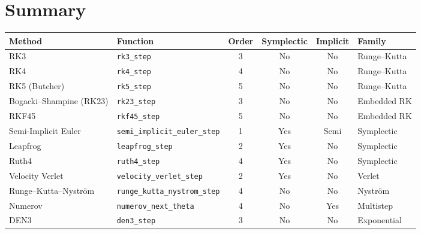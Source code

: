 \documentclass[11pt,a4paper]{article}
\begin{document}
\section{Summary}
\label{sec:summary}

\begin{center}
\small
\renewcommand{\arraystretch}{1.2}
\begin{tabular}{>{\raggedright}p{4.2cm} l c c c >{\raggedright\arraybackslash}p{2.5cm}}
  \hline
  \textbf{Method} & \textbf{Function} & \textbf{Order} & \textbf{Symplectic} & \textbf{Implicit} & \textbf{Family} \\
  \hline
  RK3                      & \texttt{rk3\_step}                 & 3 & No  & No   & Runge--Kutta \\
  RK4                      & \texttt{rk4\_step}                 & 4 & No  & No   & Runge--Kutta \\
  RK5 (Butcher)            & \texttt{rk5\_step}                 & 5 & No  & No   & Runge--Kutta \\
  Bogacki--Shampine (RK23) & \texttt{rk23\_step}                & 3 & No  & No   & Embedded RK \\
  RKF45                    & \texttt{rkf45\_step}               & 5 & No  & No   & Embedded RK \\
  Semi-Implicit Euler      & \texttt{semi\_implicit\_euler\_step} & 1 & Yes & Semi & Symplectic \\
  Leapfrog                 & \texttt{leapfrog\_step}            & 2 & Yes & No   & Symplectic \\
  Ruth4                    & \texttt{ruth4\_step}               & 4 & Yes & No   & Symplectic \\
  Velocity Verlet          & \texttt{velocity\_verlet\_step}    & 2 & Yes & No   & Verlet \\
  Runge--Kutta--Nystr\"{o}m & \texttt{runge\_kutta\_nystrom\_step} & 4 & No & No & Nystr\"{o}m \\
  Numerov                  & \texttt{numerov\_next\_theta}      & 4 & No  & Yes  & Multistep \\
  DEN3                     & \texttt{den3\_step}                & 3 & No  & No   & Exponential \\
  \hline
\end{tabular}
\end{center}
\end{document}
